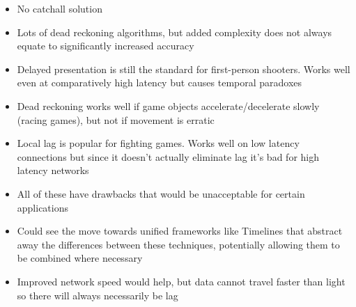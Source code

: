 \documentclass[conference]{IEEEtran}
\begin{document}
	\begin{itemize}
		\item No catchall solution
		\item Lots of dead reckoning algorithms, but added complexity does not always equate to significantly increased accuracy
		\item Delayed presentation is still the standard for first-person shooters. Works well even at comparatively high latency but causes temporal paradoxes
		\item Dead reckoning works well if game objects accelerate/decelerate slowly (racing games), but not if movement is erratic
		\item Local lag is popular for fighting games. Works well on low latency connections but since it doesn't actually eliminate lag it's bad for high latency networks
		\item All of these have drawbacks that would be unacceptable for certain applications
		\item Could see the move towards unified frameworks like Timelines that abstract away the differences between these techniques, potentially allowing them to be combined where necessary
		\item Improved network speed would help, but data cannot travel faster than light so there will always necessarily be lag
	\end{itemize}

	\printbibliography
\end{document}
